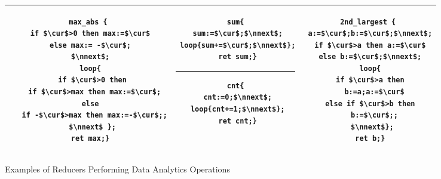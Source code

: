 \begin{figure}
	\centering
	\lstset{language=C,
		basicstyle=\ttfamily\scriptsize}
	\begin{tabular}{|c|c|c|}
		\hline
		\begin{minipage}[t]{0.39\textwidth}
		\vspace{-0.5cm}
			\begin{lstlisting}[mathescape=true]
max_abs {
 if $\cur$>0 then max:=$\cur$
 else max:= -$\cur$;
 $\nnext$;
 loop{
  if $\cur$>0 then
   if $\cur$>max then max:=$\cur$;
  else 
   if -$\cur$>max then max:=-$\cur$;;
  $\nnext$ };
 ret max;}
	\end{lstlisting}
		\end{minipage}&
		\begin{minipage}[t]{0.27\textwidth}
		\vspace{-0.5cm}
			\begin{lstlisting}[mathescape=true]
sum{
 sum:=$\cur$;$\nnext$;
 loop{sum+=$\cur$;$\nnext$};
 ret sum;}
			\end{lstlisting}
\hrule\vspace{0.1cm}%
			\begin{lstlisting}[mathescape=true]
cnt{
 cnt:=0;$\nnext$;
 loop{cnt+=1;$\nnext$};
 ret cnt;}
			\end{lstlisting}			
		\end{minipage}&
		\begin{minipage}[t]{0.30\textwidth}
		\vspace{-0.5cm}			
			\begin{lstlisting}[mathescape=true]
2nd_largest {
 a:=$\cur$;b:=$\cur$;$\nnext$;
 if $\cur$>a then a:=$\cur$
 else b:=$\cur$;$\nnext$;
 loop{
  if $\cur$>a then 
   b:=a;a:=$\cur$
  else if $\cur$>b then 
   b:=$\cur$;;
  $\nnext$};
 ret b;}
			\end{lstlisting}		
		\end{minipage}\\
		\hline		
	\end{tabular}
	\caption{Examples of Reducers Performing Data Analytics Operations}
	\label{fig:examples}
\end{figure}
\vspace{-0.5cm}
